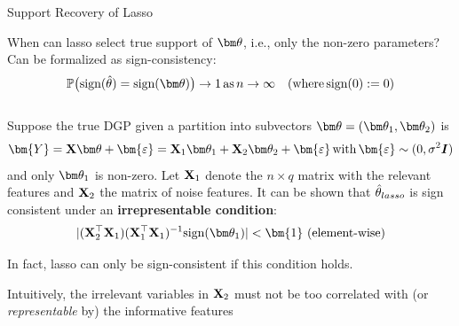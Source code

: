 \documentclass[11pt,compress,t,notes=noshow, xcolor=table]{beamer}
\begin{document}
\begin{vbframe}{Support Recovery of Lasso }
\begin{small}
When can lasso select true support of $\thetav$, i.e., only the non-zero parameters? \\
Can be formalized as sign-consistency: 
\begin{align*}
\mathbb{P}\big(\text{sign}(\thetah)=\text{sign}(\thetav)\big) \to 1 \, \text{as} \, n \to \infty \quad (\text{where}\,\text{sign}(0):=0) 
\end{align*}
\\
Suppose the true DGP given a partition into subvectors $\thetav=(\thetav_1, \thetav_2)$ is 
\begin{align*}
    \bm{Y}=\Xmat\thetav + \bm{\varepsilon} = \Xmat_1 \thetav_1 + \Xmat_2 \thetav_2 + \bm{\varepsilon}\,\text{with}\,\bm{\varepsilon}\sim (0,\sigma^2 \id)
\end{align*}
and only $\thetav_1$ is non-zero.
\vspace{0.1cm}
Let $\mathbf{X}_1$ denote the $n \times q$ matrix with the relevant features and $\mathbf{X}_2$ the matrix of noise features. It can be shown that $\hat{\theta}_{lasso}$ is sign consistent under an \textbf{irrepresentable condition}:
\begin{align*}
    \vert (\Xmat_2^{\top} \Xmat_1)(\Xmat_1^{\top} \Xmat_1)^{-1} \text{sign}(\thetav_1)\vert < \bm{1} \,\, (\text{element-wise})
\end{align*}

In fact, lasso can only be sign-consistent if this condition holds.

Intuitively, the irrelevant variables in $\mathbf{X}_2$ must not be too correlated with (or \textit{representable} by) the informative features 
\end{small}
\end{vbframe}

\endlecture
\end{document}

